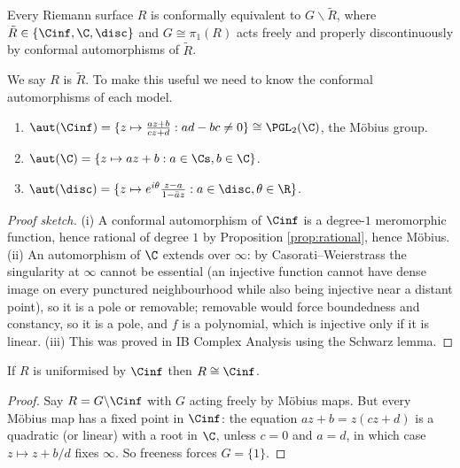 \begin{corollary}\label{cor:uniformisationgeneral}
	Every Riemann surface $R$ is conformally equivalent to $G\backslash\tilde R$, where
	$\tilde R \in \{\Cinf, \C, \disc\}$ and $G \cong \pi_1(R)$ acts freely and properly
	discontinuously by conformal automorphisms of $\tilde R$.
\end{corollary}

We say $R$ is  $\tilde R$. To make this useful we need to know the
conformal automorphisms of each model.

\begin{proposition}\label{prop:automorphisms}
	\begin{enumerate}[label=(\roman*)]
		\item $\aut(\Cinf) = \{z\mapsto \frac{az+b}{cz+d} : ad-bc\neq0\} \cong \PGL_2(\C)$,
		the M\"obius group.
		\item $\aut(\C) = \{z\mapsto az+b : a \in \Cs, b\in\C\}$.
		\item $\aut(\disc) = \{z\mapsto e^{i\theta}\frac{z-a}{1-\bar az} : a\in\disc, \theta\in\R\}$.
	\end{enumerate}
\end{proposition}

\begin{proof}[Proof sketch]
	(i) A conformal automorphism of $\Cinf$ is a degree-$1$ meromorphic function, hence
	rational of degree $1$ by Proposition \ref{prop:rational}, hence M\"obius. (ii) An
	automorphism of $\C$ extends over $\infty$: by Casorati--Weierstrass the singularity at
	$\infty$ cannot be essential (an injective function cannot have dense image on every
	punctured neighbourhood while also being injective near a distant point), so it is a
	pole or removable; removable would force boundedness and constancy, so it is a pole, and
	$f$ is a polynomial, which is injective only if it is linear. (iii) This was proved in
	IB Complex Analysis using the Schwarz lemma.
\end{proof}

\begin{proposition}\label{prop:uniformbyCinf}
	If $R$ is uniformised by $\Cinf$ then $R \cong \Cinf$.
\end{proposition}

\begin{proof}
	Say $R = G\backslash\Cinf$ with $G$ acting freely by M\"obius maps. But every M\"obius
	map has a fixed point in $\Cinf$: the equation $az+b = z(cz+d)$ is a quadratic (or
	linear) with a root in $\C$, unless $c = 0$ and $a = d$, in which case $z \mapsto z + b/d$
	fixes $\infty$. So freeness forces $G = \{1\}$.
\end{proof}

